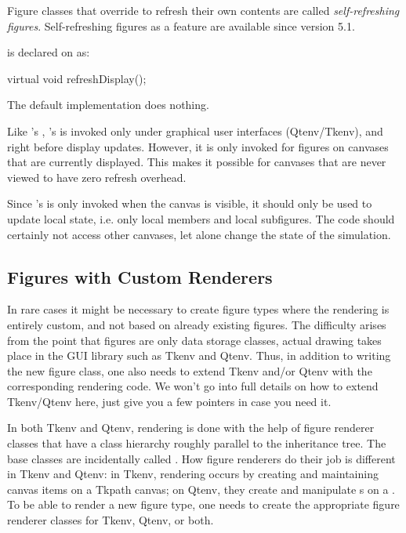 Figure classes that override  to refresh their
own contents are called \textit{self-refreshing figures}. Self-refreshing
figures as a feature are available since {\opp} version 5.1.

 is declared on  as:

\begin{cpp}
virtual void refreshDisplay();
\end{cpp}

The default implementation does nothing.

Like 's , 's
 is invoked only under graphical user interfaces
(Qtenv/Tkenv), and right before display updates. However, it is only invoked for
figures on canvases that are currently displayed. This makes it possible for
canvases that are never viewed to have zero refresh overhead.

Since 's  is only invoked when the
canvas is visible, it should only be used to update local state, i.e. only
local members and local subfigures. The code should certainly not access
other canvases, let alone change the state of the simulation.


\subsection{Figures with Custom Renderers}
\label{sec:graphics:figures-with-custom-renderers}

In rare cases it might be necessary to create figure types where the rendering
is entirely custom, and not based on already existing figures. The
difficulty arises from the point that figures are only data storage classes,
actual drawing takes place in the GUI library such as Tkenv and Qtenv.
Thus, in addition to writing the new figure class, one also needs to extend
Tkenv and/or Qtenv with the corresponding rendering code.
We won't go into full details on how to extend Tkenv/Qtenv here, just give
you a few pointers in case you need it.

In both Tkenv and Qtenv, rendering is done with the help of figure renderer
classes that have a class hierarchy roughly parallel to the
 inheritance tree. The base classes are incidentally called
. How figure renderers do their job is different in
Tkenv and Qtenv: in Tkenv, rendering occurs by creating and maintaining
canvas items on a Tkpath canvas; on Qtenv, they create and manipulate
s on a . To be able to render a
new figure type, one needs to create the appropriate figure renderer
classes for Tkenv, Qtenv, or both.

